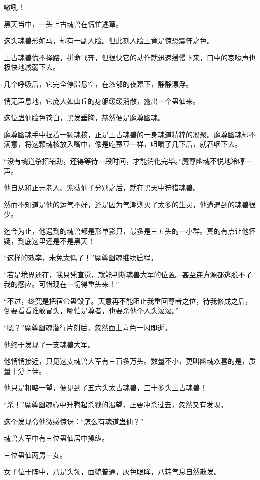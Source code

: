 
\begin{this_body}

嗷吼！

黑天当中，一头上古魂兽在慌忙逃窜。

这头魂兽形如马，却有一副人脸。但此刻人脸上竟是惊恐震怖之色。

上古魂兽慌不择路，拼命飞奔，但很快它的动作就迅速缓慢下来，口中的哀嚎声也极快地减弱下去。

几个呼吸后，它完全停滞悬空，在浓郁的夜幕下，静静漂浮。

悄无声息地，它庞大如山丘的身躯缓缓消散，露出一个蛊仙来。

这位蛊仙脸色苍白，黑发垂胸，赫然便是魔尊幽魂。

魔尊幽魂手中捏着一颗魂核，正是上古魂兽的一身魂道精粹的凝聚。魔尊幽魂却不满意，将这颗魂核放入嘴中，像是吃蚕豆一样，咀嚼了几下后，就吞咽下去。

“没有魂道杀招辅助，还得等待一段时间，才能消化完毕。”魔尊幽魂不悦地冷哼一声。

他自从和正元老人、紫薇仙子分别之后，就在黑天中狩猎魂兽。

然而不知道是他的运气不好，还是因为气潮剿灭了太多的生灵，他遭遇到的魂兽很少。

迄今为止，他遇到的魂兽都是形单影只，最多是三五头的一小群。真的有点让他怀疑，到底这里还是不是黑天！

“这样的效率，未免太低了！”魔尊幽魂继续启程。

“若是境界还在，我只凭直觉，就能判断魂兽大军的位置。甚至连方源都逃脱不了我的感应。可惜现在一切得重头来！”

“不过，终究是把宿命蛊毁了。天意再不能阻止我重回尊者之位，待我修成之后，倒要看看谁敢冒头，哪怕是尊者，也要杀他个人头滚滚。”

“嗯？”魔尊幽魂潜行片刻后，忽然面上喜色一闪即逝。

他终于发现了一支魂兽大军。

他悄悄接近，只见这支魂兽大军有三百多万头。数量不小，更叫幽魂欢喜的是，质量十分上佳。

他只是粗略一望，便见到了五六头太古魂兽，三十多头上古魂兽！

“杀！”魔尊幽魂心中升腾起杀戮的渴望，正要冲杀过去，忽然又有发现。

这个发现令他微感惊讶：“怎么有魂道蛊仙？”

魂兽大军中有三位蛊仙居中操纵。

三位蛊仙两男一女。

女子位于阵中，乃是头领，面貌普通，灰色眼眸，八转气息自然散发。


\end{this_body}
